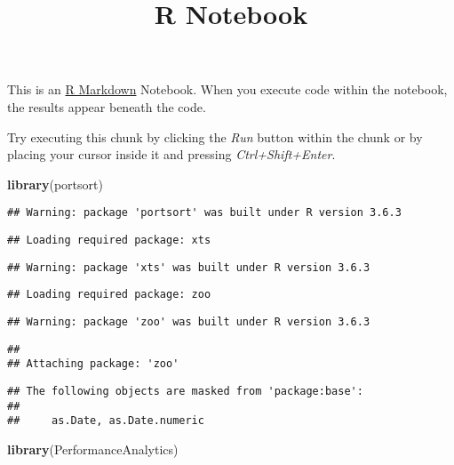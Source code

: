 \documentclass[
]{article}
\title{R Notebook}
\author{}
\date{\vspace{-2.5em}}
\newenvironment{Shaded}{\begin{snugshade}}{\end{snugshade}}
\newcommand{\KeywordTok}[1]{\textcolor[rgb]{0.13,0.29,0.53}{\textbf{#1}}}
\newcommand{\NormalTok}[1]{#1}
\begin{document}
\maketitle

This is an \href{http://rmarkdown.rstudio.com}{R Markdown} Notebook.
When you execute code within the notebook, the results appear beneath
the code.

Try executing this chunk by clicking the \emph{Run} button within the
chunk or by placing your cursor inside it and pressing
\emph{Ctrl+Shift+Enter}.

\begin{Shaded}
\begin{Highlighting}[]
\KeywordTok{library}\NormalTok{(portsort)}
\end{Highlighting}
\end{Shaded}

\begin{verbatim}
## Warning: package 'portsort' was built under R version 3.6.3
\end{verbatim}

\begin{verbatim}
## Loading required package: xts
\end{verbatim}

\begin{verbatim}
## Warning: package 'xts' was built under R version 3.6.3
\end{verbatim}

\begin{verbatim}
## Loading required package: zoo
\end{verbatim}

\begin{verbatim}
## Warning: package 'zoo' was built under R version 3.6.3
\end{verbatim}

\begin{verbatim}
## 
## Attaching package: 'zoo'
\end{verbatim}

\begin{verbatim}
## The following objects are masked from 'package:base':
## 
##     as.Date, as.Date.numeric
\end{verbatim}

\begin{Shaded}
\begin{Highlighting}[]
\KeywordTok{library}\NormalTok{(PerformanceAnalytics)}
\end{Highlighting}
\end{Shaded}
\end{document}
